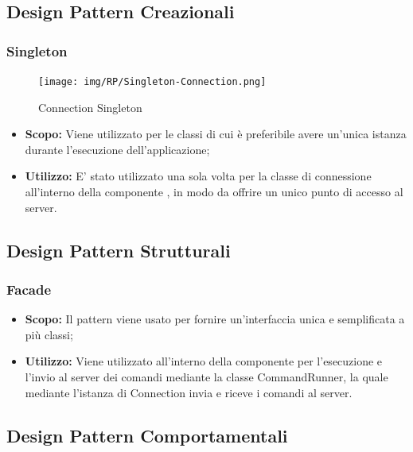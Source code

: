 \documentclass{scalatekids-article}
\begin{document}
\subsection{Design Pattern Creazionali}

\subsubsection{Singleton}

\begin{figure}[H]
  \begin{center}
    \texttt{[image: img/RP/Singleton-Connection.png]}
    \caption{Connection Singleton}
  \end{center}
\end{figure}

\begin{itemize}
\item \textbf{Scopo:} Viene utilizzato per le classi di cui è preferibile avere un'unica istanza
  durante l'esecuzione dell'applicazione;
\item \textbf{Utilizzo:} E' stato utilizzato una sola volta per la classe di connessione all'interno
  della componente , in modo da offrire un unico punto di accesso al server.
\end{itemize}

\subsection{Design Pattern Strutturali}

\subsubsection{Facade}

\begin{itemize}
\item \textbf{Scopo:} Il pattern  viene usato per fornire
  un'interfaccia unica e semplificata a più classi;
\item \textbf{Utilizzo:} Viene utilizzato all'interno della componente
   per l'esecuzione e l'invio al server dei comandi mediante
  la classe CommandRunner, la quale mediante l'istanza  di
  Connection invia e riceve i comandi al server.
\end{itemize}

\subsection{Design Pattern Comportamentali}
\end{document}
